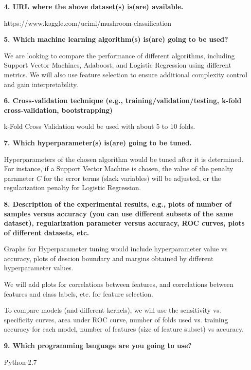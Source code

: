 \documentclass[10pt,letterpaper]{article}
\newcommand{\somespace}{\vspace{0.075in}}
\begin{document}
\somespace
\noindent \textbf{4. URL where the above dataset(s) is(are) available.}
\somespace

https://www.kaggle.com/uciml/mushroom-classification

\somespace
\noindent \textbf{5. Which machine learning algorithm(s) is(are) going to be used?}
\somespace

We are looking to compare the performance of different algorithms, including
Support Vector Machines, Adaboost, and Logistic Regression using different metrics. We
will also use feature selection to ensure additional complexity control and gain
interpretability.

\somespace
\noindent \textbf{6. Cross-validation technique (e.g., training/validation/testing, k-fold cross-validation, bootstrapping)}
\somespace

k-Fold Cross Validation would be used with about 5 to 10 folds.

\somespace
\noindent \textbf{7. Which hyperparameter(s) is(are) going to be tuned.}
\somespace

Hyperparameters of the chosen algorithm would be tuned after it is determined. For instance,
if a Support Vector Machine is chosen, the value of the penalty parameter $ C $ for the
error terms (slack variables) will be adjusted, or the regularization penalty for Logistic
Regression.

\somespace
\noindent \textbf{8. Description of the experimental results, e.g., plots of number of samples versus accuracy (you can use different subsets of the same dataset), regularization parameter versus accuracy, ROC curves, plots of different datasets, etc.}
\somespace

Graphs for Hyperparameter tuning would include hyperparameter value vs accuracy, plots of
descion boundary and margins obtained by different hyperparameter values.

We will add plots for correlations between features, and correlations between features and
class labels, etc. for feature selection.

To compare models (and different kernels), we will use the sensitivity vs. specificity
curves, area under ROC curve, number of folds used vs. training accuracy for each model,
number of features (size of feature subset) vs accuracy.

\somespace
\noindent \textbf{9. Which programming language are you going to use?}
\somespace

Python-2.7

\somespace
\end{document}
